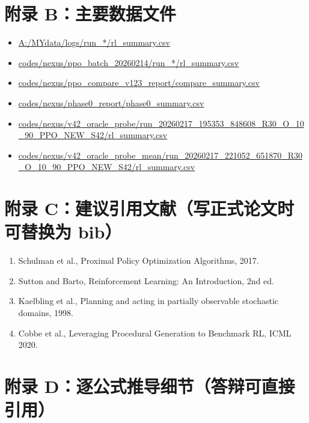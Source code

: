 ﻿\documentclass[11pt,a4paper]{ctexart}
\begin{document}
\section*{附录 B：主要数据文件}
\begin{itemize}
  \item \url{A:/MYdata/logs/run_*/rl_summary.csv}
  \item \url{codes/nexus/ppo_batch_20260214/run_*/rl_summary.csv}
  \item \url{codes/nexus/ppo_compare_v123_report/compare_summary.csv}
  \item \url{codes/nexus/phase0_report/phase0_summary.csv}
  \item \url{codes/nexus/v42_oracle_probe/run_20260217_195353_848608_R30_O_10_90_PPO_NEW_S42/rl_summary.csv}
  \item \url{codes/nexus/v42_oracle_probe_mean/run_20260217_221052_651870_R30_O_10_90_PPO_NEW_S42/rl_summary.csv}
\end{itemize}

\section*{附录 C：建议引用文献（写正式论文时可替换为 bib）}
\begin{enumerate}[leftmargin=*]
  \item Schulman et al., Proximal Policy Optimization Algorithms, 2017.
  \item Sutton and Barto, Reinforcement Learning: An Introduction, 2nd ed.
  \item Kaelbling et al., Planning and acting in partially observable stochastic domains, 1998.
  \item Cobbe et al., Leveraging Procedural Generation to Benchmark RL, ICML 2020.
\end{enumerate}

\section*{附录 D：逐公式推导细节（答辩可直接引用）}
\end{document}
